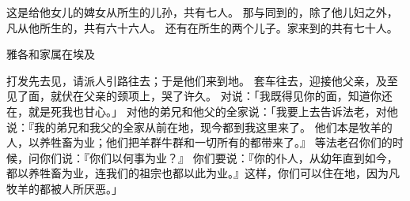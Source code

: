 {这是{}给他女儿{}的婢女{}从{}所生的儿孙，共有七人。
那与{}同到{}的，除了他儿妇之外，凡从他所生的，共有六十六人。
还有{}在{}所生的两个儿子。{}家来到{}的共有七十人。
\par }{\SH 雅各和家属在埃及
\par }{\PP {}打发{}先去见{}，请派人引路往{}去；于是他们来到{}地。
套车往{}去，迎接他父亲{}，及至见了面，就伏在父亲的颈项上，哭了许久。
对{}说：「我既得见你的面，知道你还在，就是死我也甘心。」
对他的弟兄和他父的全家说：「我要上去告诉法老，对他说：『我的弟兄和我父的全家从前在{}地，现今都到我这里来了。
他们本是牧羊的人，以养牲畜为业；他们把羊群牛群和一切所有的都带来了。』
等法老召你们的时候，问你们说：『你们以何事为业？』
你们要说：『你的仆人，从幼年直到如今，都以养牲畜为业，连我们的祖宗也都以此为业。』这样，你们可以住在{}地，因为凡牧羊的都被{}人所厌恶。」

}
